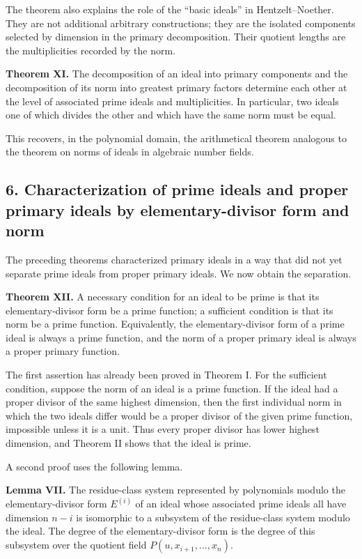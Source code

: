\documentclass[12pt]{article}
\begin{document}
The theorem also explains the role of the ``basic ideals'' in Hentzelt--Noether. They are not additional arbitrary constructions; they are the isolated components selected by dimension in the primary decomposition. Their quotient lengths are the multiplicities recorded by the norm.

\textbf{Theorem XI.} The decomposition of an ideal into primary components and the decomposition of its norm into greatest primary factors determine each other at the level of associated prime ideals and multiplicities. In particular, two ideals one of which divides the other and which have the same norm must be equal.

This recovers, in the polynomial domain, the arithmetical theorem analogous to the theorem on norms of ideals in algebraic number fields.

\subsection{6. Characterization of prime ideals and proper primary ideals by elementary-divisor form and norm}

The preceding theorems characterized primary ideals in a way that did not yet separate prime ideals from proper primary ideals. We now obtain the separation.

\textbf{Theorem XII.} A necessary condition for an ideal to be prime is that its elementary-divisor form be a prime function; a sufficient condition is that its norm be a prime function. Equivalently, the elementary-divisor form of a prime ideal is always a prime function, and the norm of a proper primary ideal is always a proper primary function.

The first assertion has already been proved in Theorem I. For the sufficient condition, suppose the norm of an ideal is a prime function. If the ideal had a proper divisor of the same highest dimension, then the first individual norm in which the two ideals differ would be a proper divisor of the given prime function, impossible unless it is a unit. Thus every proper divisor has lower highest dimension, and Theorem II shows that the ideal is prime.

A second proof uses the following lemma.

\textbf{Lemma VII.} The residue-class system represented by polynomials modulo the elementary-divisor form $E^{(i)}$ of an ideal whose associated prime ideals all have dimension $n-i$ is isomorphic to a subsystem of the residue-class system modulo the ideal. The degree of the elementary-divisor form is the degree of this subsystem over the quotient field $P(u,x_{i+1},\ldots,x_n)$.
\end{document}
